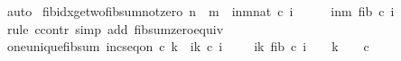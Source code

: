 \begin{isabellebody}
\ auto%
\endisatagproof
{\isafoldproof}%
%
\isadelimproof
\isanewline
%
\endisadelimproof
\isanewline
{}\isamarkupfalse%
\ fib{\isacharunderscore}{\kern0pt}idx{\isacharunderscore}{\kern0pt}ge{\isacharunderscore}{\kern0pt}two{\isacharunderscore}{\kern0pt}fib{\isacharunderscore}{\kern0pt}sum{\isacharunderscore}{\kern0pt}not{\isacharunderscore}{\kern0pt}zero{\isacharcolon}{\kern0pt}\ {\isachardoublequoteopen}n\ {\isasymle}\ m\ {\isasymLongrightarrow}\ {\isasymforall}i{\isasymin}{\isacharbraceleft}{\kern0pt}n{\isachardot}{\kern0pt}{\isachardot}{\kern0pt}m{\isacharcolon}{\kern0pt}{\isacharcolon}{\kern0pt}nat{\isacharbraceright}{\kern0pt}{\isachardot}{\kern0pt}\ c\ i\ {\isasymge}\ {}\ {\isasymLongrightarrow}\ {\isasymnot}\ {\isacharparenleft}{\kern0pt}{\isasymSum}\ i{\isacharequal}{\kern0pt}n{\isachardot}{\kern0pt}{\isachardot}{\kern0pt}m{\isachardot}{\kern0pt}\ fib\ {\isacharparenleft}{\kern0pt}c\ i{\isacharparenright}{\kern0pt}{\isacharparenright}{\kern0pt}\ {\isacharequal}{\kern0pt}\ {}{\isachardoublequoteclose}\isanewline
%
\isadelimproof
\ \ %
\endisadelimproof
%
\isatagproof
{}\isamarkupfalse%
\ {\isacharparenleft}{\kern0pt}rule\ ccontr{\isacharcomma}{\kern0pt}\ simp\ add{\isacharcolon}{\kern0pt}\ fib{\isacharunderscore}{\kern0pt}sum{\isacharunderscore}{\kern0pt}zero{\isacharunderscore}{\kern0pt}equiv{\isacharparenright}{\kern0pt}%
\endisatagproof
{\isafoldproof}%
%
\isadelimproof
\isanewline
%
\endisadelimproof
\isanewline
{}\isamarkupfalse%
\ one{\isacharunderscore}{\kern0pt}unique{\isacharunderscore}{\kern0pt}fib{\isacharunderscore}{\kern0pt}sum{\isacharcolon}{\kern0pt}\ {\isachardoublequoteopen}inc{\isacharunderscore}{\kern0pt}seq{\isacharunderscore}{\kern0pt}on\ c\ {\isacharbraceleft}{\kern0pt}{}{\isachardot}{\kern0pt}{\isachardot}{\kern0pt}k{\isacharminus}{\kern0pt}{}{\isacharbraceright}{\kern0pt}\ {\isasymLongrightarrow}\ {\isasymforall}i{\isasymin}{\isacharbraceleft}{\kern0pt}{}{\isachardot}{\kern0pt}{\isachardot}{\kern0pt}k{\isacharbraceright}{\kern0pt}{\isachardot}{\kern0pt}\ c\ i\ {\isasymge}\ {}\ {\isasymLongrightarrow}\ {\isacharparenleft}{\kern0pt}{\isasymSum}\ i{\isacharequal}{\kern0pt}{}{\isachardot}{\kern0pt}{\isachardot}{\kern0pt}k{\isachardot}{\kern0pt}\ fib\ {\isacharparenleft}{\kern0pt}c\ i{\isacharparenright}{\kern0pt}{\isacharparenright}{\kern0pt}\ {\isacharequal}{\kern0pt}\ {}\ {\isasymlongleftrightarrow}\ k\ {\isacharequal}{\kern0pt}\ {}\ {\isasymand}\ c\ {}\ {\isacharequal}{\kern0pt}\ {}{\isachardoublequoteclose}\isanewline

\end{isabellebody}
